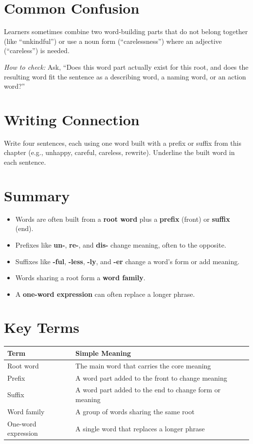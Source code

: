 \section{Common Confusion}
\begin{warningbox}
Learners sometimes combine two word-building parts that do not belong together (like ``unkindful'') or use a noun form (``carelessness'') where an adjective (``careless'') is needed.

\textit{How to check:} Ask, ``Does this word part actually exist for this root, and does the resulting word fit the sentence as a describing word, a naming word, or an action word?''
\end{warningbox}

\section{Writing Connection}
Write four sentences, each using one word built with a prefix or suffix from this chapter (e.g., unhappy, careful, careless, rewrite). Underline the built word in each sentence.

\section{Summary}
\begin{summarybox}
\begin{itemize}
    \item Words are often built from a \textbf{root word} plus a \textbf{prefix} (front) or \textbf{suffix} (end).
    \item Prefixes like \textbf{un-}, \textbf{re-}, and \textbf{dis-} change meaning, often to the opposite.
    \item Suffixes like \textbf{-ful}, \textbf{-less}, \textbf{-ly}, and \textbf{-er} change a word's form or add meaning.
    \item Words sharing a root form a \textbf{word family}.
    \item A \textbf{one-word expression} can often replace a longer phrase.
\end{itemize}
\end{summarybox}

\section{Key Terms}
\begin{table}[h!]
\centering
\begin{tabular}{|l|l|}
\hline
\textbf{Term} & \textbf{Simple Meaning} \\
\hline
Root word & The main word that carries the core meaning \\
Prefix & A word part added to the front to change meaning \\
Suffix & A word part added to the end to change form or meaning \\
Word family & A group of words sharing the same root \\
One-word expression & A single word that replaces a longer phrase \\
\hline
\end{tabular}
\end{table}

